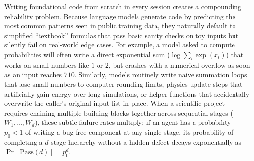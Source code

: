 \documentclass[10pt,twocolumn]{article}
\begin{document}
Writing foundational code from scratch in every session creates a compounding reliability problem. Because language models generate code by predicting the most common patterns seen in public training data, they naturally default to simplified ``textbook'' formulas that pass basic sanity checks on toy inputs but silently fail on real-world edge cases. For example, a model asked to compute probabilities will often write a direct exponential sum ($\log \sum_i \exp(x_i)$) that works on small numbers like $1$ or $2$, but crashes with a numerical overflow as soon as an input reaches $710$. Similarly, models routinely write naive summation loops that lose small numbers to computer rounding limits, physics update steps that artificially gain energy over long simulations, or helper functions that accidentally overwrite the caller's original input list in place. When a scientific project requires chaining multiple building blocks together across sequential stages ($W_1, \dots, W_d$), these subtle failure rates multiply: if an agent has a probability $p_0 < 1$ of writing a bug-free component at any single stage, its probability of completing a $d$-stage hierarchy without a hidden defect decays exponentially as $\Pr[\text{Pass}(d)] = p_0^d$.
\end{document}

